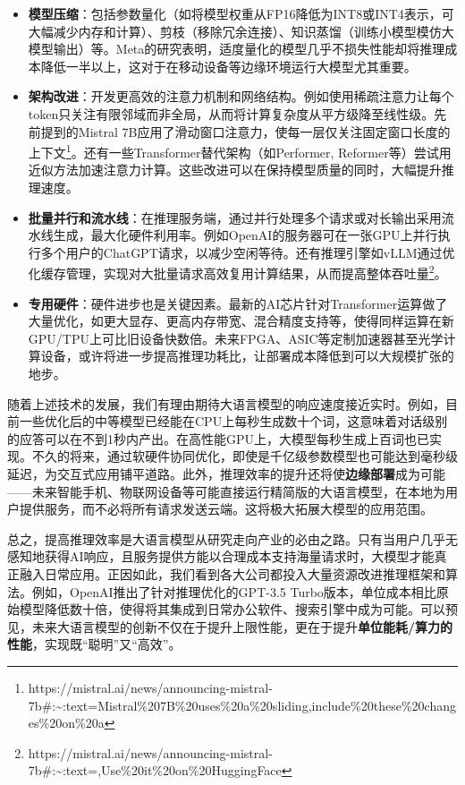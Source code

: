 \documentclass[
  letterpaper,
]{scrbook}
\begin{document}
\begin{itemize}
\item
  \textbf{模型压缩}：包括参数量化（如将模型权重从FP16降低为INT8或INT4表示，可大幅减少内存和计算）、剪枝（移除冗余连接）、知识蒸馏（训练小模型模仿大模型输出）等。Meta的研究表明，适度量化的模型几乎不损失性能却将推理成本降低一半以上，这对于在移动设备等边缘环境运行大模型尤其重要。
\item
  \textbf{架构改进}：开发更高效的注意力机制和网络结构。例如使用稀疏注意力让每个token只关注有限邻域而非全局，从而将计算复杂度从平方级降至线性级。先前提到的Mistral
  7B应用了滑动窗口注意力，使每一层仅关注固定窗口长度的上下文\footnote{https://mistral.ai/news/announcing-mistral-7b\#:\textasciitilde:text=Mistral\%207B\%20uses\%20a\%20sliding,include\%20these\%20changes\%20on\%20a}。还有一些Transformer替代架构（如Performer,
  Reformer等）尝试用近似方法加速注意力计算。这些改进可以在保持模型质量的同时，大幅提升推理速度。
\item
  \textbf{批量并行和流水线}：在推理服务端，通过并行处理多个请求或对长输出采用流水线生成，最大化硬件利用率。例如OpenAI的服务器可在一张GPU上并行执行多个用户的ChatGPT请求，以减少空闲等待。还有推理引擎如vLLM通过优化缓存管理，实现对大批量请求高效复用计算结果，从而提高整体吞吐量\footnote{https://mistral.ai/news/announcing-mistral-7b\#:\textasciitilde:text=,Use\%20it\%20on\%20HuggingFace}。
\item
  \textbf{专用硬件}：硬件进步也是关键因素。最新的AI芯片针对Transformer运算做了大量优化，如更大显存、更高内存带宽、混合精度支持等，使得同样运算在新GPU/TPU上可比旧设备快数倍。未来FPGA、ASIC等定制加速器甚至光学计算设备，或许将进一步提高推理功耗比，让部署成本降低到可以大规模扩张的地步。
\end{itemize}

随着上述技术的发展，我们有理由期待大语言模型的响应速度接近实时。例如，目前一些优化后的中等模型已经能在CPU上每秒生成数十个词，这意味着对话级别的应答可以在不到1秒内产出。在高性能GPU上，大模型每秒生成上百词也已实现。不久的将来，通过软硬件协同优化，即使是千亿级参数模型也可能达到毫秒级延迟，为交互式应用铺平道路。此外，推理效率的提升还将使\textbf{边缘部署}成为可能------未来智能手机、物联网设备等可能直接运行精简版的大语言模型，在本地为用户提供服务，而不必将所有请求发送云端。这将极大拓展大模型的应用范围。

总之，提高推理效率是大语言模型从研究走向产业的必由之路。只有当用户几乎无感知地获得AI响应，且服务提供方能以合理成本支持海量请求时，大模型才能真正融入日常应用。正因如此，我们看到各大公司都投入大量资源改进推理框架和算法。例如，OpenAI推出了针对推理优化的GPT-3.5
Turbo版本，单位成本相比原始模型降低数十倍，使得将其集成到日常办公软件、搜索引擎中成为可能。可以预见，未来大语言模型的创新不仅在于提升上限性能，更在于提升\textbf{单位能耗/算力的性能}，实现既``聪明''又``高效''。
\end{document}
